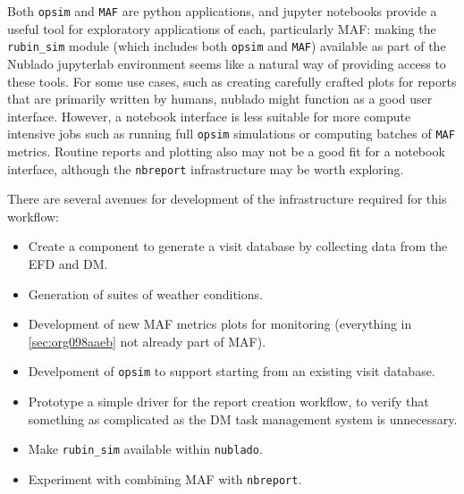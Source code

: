Both \texttt{opsim} and \texttt{MAF} are python applications, and jupyter notebooks provide a useful tool for exploratory applications of each, particularly MAF: making the \texttt{rubin\_sim} module (which includes both \texttt{opsim} and \texttt{MAF}) available as part of the Nublado jupyterlab environment seems like a natural way of providing access to these tools. For some use cases, such as creating carefully crafted plots for reports that are primarily written by humans, nublado might function as a good user interface. However, a notebook interface is less suitable for more compute intensive jobs such as running full \texttt{opsim} simulations or computing batches of \texttt{MAF} metrics. Routine reports and plotting also may not be a good fit for a notebook interface, although the \texttt{nbreport} infrastructure may be worth exploring.

There are several avenues for development of the infrastructure required for this workflow:
\begin{itemize}
\item Create a component to generate a visit database by collecting data from the EFD and DM.
\item Generation of suites of weather conditions.
\item Development of new MAF metrics plots for monitoring (everything in \ref{sec:org098aaeb} not already part of MAF).
\item Develpoment of \texttt{opsim} to support starting from an existing visit database.
\item Prototype a simple driver for the report creation workflow, to verify that something as complicated as the DM task management system is unnecessary.
\item Make \texttt{rubin\_sim} available within \texttt{nublado}.
\item Experiment with combining MAF with \texttt{nbreport}.
\end{itemize}
